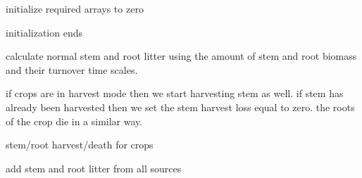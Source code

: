 initialize required arrays to zero

initialization ends 



calculate normal stem and root litter using the amount of stem and root biomass and their turnover time scales.

if crops are in harvest mode then we start harvesting stem as well. if stem has already been harvested then we set the stem harvest loss equal to zero. the roots of the crop die in a similar way.

stem/root harvest/death for crops

add stem and root litter from all sources